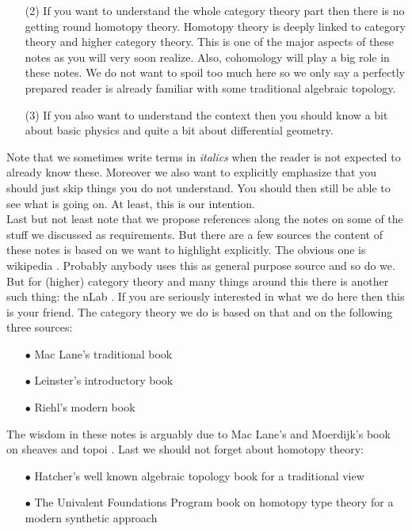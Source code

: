 \begin{enumerate}
\item[(2)]
If you want to understand the whole category theory part then there is no getting round homotopy theory. Homotopy theory is deeply linked to category theory and higher category theory. This is one of the major aspects of these notes as you will very soon realize. Also, cohomology will play a big role in these notes. We do not want to spoil too much here so we only say a perfectly prepared reader is already familiar with some traditional algebraic topology.
\item[(3)]
If you also want to understand the context then you should know a bit about basic physics and quite a bit about differential geometry.
\end{enumerate}
Note that we sometimes write terms in \textit{italics} when the reader is not expected to already know these. Moreover we also want to explicitly emphasize that you should just skip things you do not understand. You should then still be able to see what is going on. At least, this is our intention.
\\
Last but not least note that we propose references along the notes on some of the stuff we discussed as requirements. But there are a few sources the content of these notes is based on we want to highlight explicitly. The obvious one is wikipedia \cite{wiki-pedia0en}. Probably anybody uses this as general purpose source and so do we. But for (higher) category theory and many things around this there is another such thing: the nLab \cite{wiki-nlab0000}. If you are seriously interested in what we do here then this is your friend. The category theory we do is based on that and on the following three sources:
\begin{enumerate}
\item[$\bullet$]
Mac Lane's traditional book \cite{e837ef86}
\item[$\bullet$]
Leinster's introductory book \cite{dc6f686f}
\item[$\bullet$]
Riehl's modern book \cite{52fbba46}
\end{enumerate}
The {\glqq}wisdom{\grqq} in these notes is arguably due to Mac Lane's and Moerdijk's book on sheaves and topoi \cite{c55c71e8}. Last we should not forget about homotopy theory:
\begin{enumerate}
\item[$\bullet$]
Hatcher's well known algebraic topology book \cite{8b5861fc} for a traditional view
\item[$\bullet$]
The Univalent Foundations Program book on homotopy type theory \cite{1ba1603e} for a modern synthetic approach
\end{enumerate}
